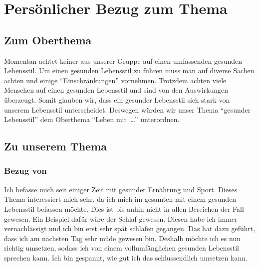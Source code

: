 \chapter{Persönlicher Bezug zum Thema}
\section{Zum Oberthema}
\authortoc{\dario}{\sectionident}
Momentan achtet keiner aus unserer Gruppe auf einen umfassenden gesunden Lebensstil.
Um einen gesunden Lebensstil zu führen muss man auf diverse Sachen achten und einige “Einschränkungen” vornehmen. Trotzdem achten viele Menschen auf einen gesunden Lebensstil und sind von den Auswirkungen überzeugt. 
Somit glauben wir, dass ein gesunder Lebensstil sich stark von unserem Lebensstil unterscheidet. Deswegen würden wir unser Thema “gesunder Lebensstil” dem Oberthema “Leben mit ….” unterordnen.
\section{Zu unserem Thema}
\subsection{Bezug von \bastian}
\authortoc{\bastian}{\subsectionident}
Ich befasse mich seit einiger Zeit mit gesunder Ernährung und Sport. Dieses Thema interessiert mich sehr, da ich mich im gesamten mit einem gesunden Lebensstil befassen möchte. Dies ist bis anhin nicht in allen Bereichen der Fall gewesen. Ein Beispiel dafür wäre der Schlaf gewesen. Diesen habe ich immer vernachlässigt und ich bin erst sehr spät schlafen gegangen. Das hat dazu geführt, dass ich am nächsten Tag sehr müde gewesen bin. Deshalb möchte ich es nun richtig umsetzen, sodass ich von einem vollumfänglichen gesunden Lebensstil sprechen kann. Ich bin gespannt, wie gut ich das schlussendlich umsetzen kann.

